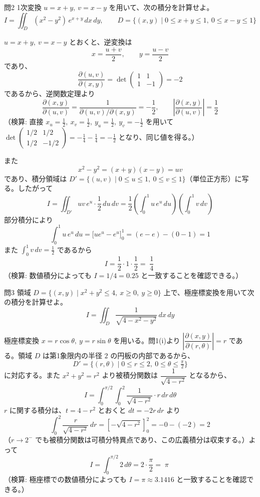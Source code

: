 \documentclass[a4paper,11pt]{article}
\begin{document}
\clearpage
\begin{mondaiboxS}{問2}
1次変換 $u = x+y,\ v = x-y$ を用いて、次の積分を計算せよ。
\[
I = \iint_{D} (x^{2} - y^{2})\, e^{x+y}\, dx\, dy, \qquad D = \{(x,y) \mid 0 \le x+y \le 1,\ 0 \le x-y \le 1\}
\]
\end{mondaiboxS}
\kaitou
$u = x+y,\ v = x-y$ とおくと、逆変換は
\[
x = \frac{u+v}{2}, \qquad y = \frac{u-v}{2}
\]
であり、
\[
\frac{\partial(u,v)}{\partial(x,y)} = \det \begin{pmatrix} 1 & 1 \\ 1 & -1 \end{pmatrix} = -2
\]
であるから、逆関数定理より
\[
\frac{\partial(x,y)}{\partial(u,v)} = \frac{1}{\partial(u,v)/\partial(x,y)} = -\frac{1}{2}, \qquad
\left| \frac{\partial(x,y)}{\partial(u,v)} \right| = \frac{1}{2}
\]
（検算: 直接 $x_u = \tfrac12,\ x_v = \tfrac12,\ y_u = \tfrac12,\ y_v = -\tfrac12$ を用いて
$\det\begin{pmatrix}1/2 & 1/2 \\ 1/2 & -1/2\end{pmatrix} = -\tfrac14 - \tfrac14 = -\tfrac12$ となり、同じ値を得る。）

また
\[
x^{2} - y^{2} = (x+y)(x-y) = uv
\]
であり、積分領域は $D' = \{(u,v) \mid 0 \le u \le 1,\ 0 \le v \le 1\}$（単位正方形）に写る。したがって
\[
I = \iint_{D'} uv\, e^{u} \cdot \frac{1}{2}\, du\, dv
= \frac{1}{2} \left( \int_{0}^{1} u\, e^{u}\, du \right) \left( \int_{0}^{1} v\, dv \right)
\]
部分積分により
\[
\int_{0}^{1} u\, e^{u}\, du = \bigl[ u e^{u} - e^{u} \bigr]_{0}^{1} = (e - e) - (0 - 1) = 1
\]
また $\displaystyle \int_{0}^{1} v\, dv = \frac{1}{2}$ であるから
\[
I = \frac{1}{2} \cdot 1 \cdot \frac{1}{2} = \boxed{\; \frac{1}{4} \;}
\]
（検算: 数値積分によっても $I = 1/4 = 0.25$ と一致することを確認できる。）

\clearpage
\begin{mondaiboxS}{問3}
領域 $D = \{(x,y) \mid x^{2} + y^{2} \le 4,\ x \ge 0,\ y \ge 0\}$ 上で、極座標変換を用いて次の積分を計算せよ。
\[
I = \iint_{D} \frac{1}{\sqrt{4 - x^{2} - y^{2}}}\, dx\, dy
\]
\end{mondaiboxS}
\kaitou
極座標変換 $x = r\cos\theta,\ y = r\sin\theta$ を用いる。問1(i)より $\left|\dfrac{\partial(x,y)}{\partial(r,\theta)}\right| = r$ である。領域 $D$ は第1象限内の半径 $2$ の円板の内部であるから、
\[
D' = \{(r,\theta) \mid 0 \le r \le 2,\ 0 \le \theta \le \tfrac{\pi}{2}\}
\]
に対応する。また $x^{2}+y^{2} = r^{2}$ より被積分関数は $\dfrac{1}{\sqrt{4-r^{2}}}$ となるから、
\[
I = \int_{0}^{\pi/2} \int_{0}^{2} \frac{1}{\sqrt{4-r^{2}}} \cdot r\, dr\, d\theta
\]
$r$ に関する積分は、$t = 4 - r^{2}$ とおくと $dt = -2r\, dr$ より
\[
\int_{0}^{2} \frac{r}{\sqrt{4-r^{2}}}\, dr
= \left[ -\sqrt{4-r^{2}} \right]_{0}^{2}
= -0 - (-2) = 2
\]
（$r \to 2^{-}$ でも被積分関数は可積分特異点であり、この広義積分は収束する。）よって
\[
I = \int_{0}^{\pi/2} 2\, d\theta = 2 \cdot \frac{\pi}{2} = \boxed{\; \pi \;}
\]
（検算: 極座標での数値積分によっても $I = \pi \approx 3.1416$ と一致することを確認できる。）
\end{document}
